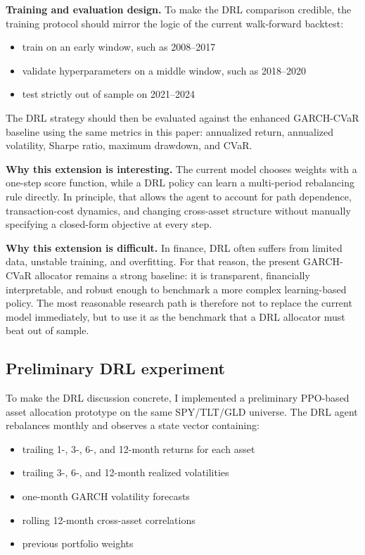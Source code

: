 \documentclass[11pt]{article}
\begin{document}
\textbf{Training and evaluation design.} To make the DRL comparison credible, the training protocol should mirror the logic of the current walk-forward backtest:
\begin{itemize}
    \item train on an early window, such as 2008--2017
    \item validate hyperparameters on a middle window, such as 2018--2020
    \item test strictly out of sample on 2021--2024
\end{itemize}
The DRL strategy should then be evaluated against the enhanced GARCH-CVaR baseline using the same metrics in this paper: annualized return, annualized volatility, Sharpe ratio, maximum drawdown, and CVaR.

\textbf{Why this extension is interesting.} The current model chooses weights with a one-step score function, while a DRL policy can learn a multi-period rebalancing rule directly. In principle, that allows the agent to account for path dependence, transaction-cost dynamics, and changing cross-asset structure without manually specifying a closed-form objective at every step.

\textbf{Why this extension is difficult.} In finance, DRL often suffers from limited data, unstable training, and overfitting. For that reason, the present GARCH-CVaR allocator remains a strong baseline: it is transparent, financially interpretable, and robust enough to benchmark a more complex learning-based policy. The most reasonable research path is therefore not to replace the current model immediately, but to use it as the benchmark that a DRL allocator must beat out of sample.

\subsection{Preliminary DRL experiment}
To make the DRL discussion concrete, I implemented a preliminary PPO-based asset allocation prototype on the same SPY/TLT/GLD universe. The DRL agent rebalances monthly and observes a state vector containing:
\begin{itemize}
    \item trailing 1-, 3-, 6-, and 12-month returns for each asset
    \item trailing 3-, 6-, and 12-month realized volatilities
    \item one-month GARCH volatility forecasts
    \item rolling 12-month cross-asset correlations
    \item previous portfolio weights
\end{itemize}
\end{document}
